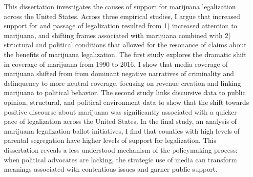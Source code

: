 %

\thesisabstract
{
  This dissertation investigates the causes of support for marijuana legalization across the United States. Across three empirical studies, I argue that increased support for and passage of legalization resulted from 1) increased attention to marijuana, and shifting frames associated with marijuana combined with 2) structural and political conditions that allowed for the resonance of claims about the benefits of marijuana legalization. The first study explores the dramatic shift in coverage of marijuana from 1990 to 2016. I show that media coverage of marijuana shifted from from dominant negative narratives of criminality and delinquency to more neutral coverage, focusing on revenue creation and linking marijuana to political behavior. The second study links discursive data to public opinion, structural, and political environment data to show that the shift towards positive discourse about marijuana was significantly associated with a quicker pace of legalization across the United States. In the final study, an analysis of marijuana legalization ballot initiatives, I find that counties with high levels of parental segregation have higher levels of support for legalization. This dissertation reveals a less understood mechanism of the policymaking process: when political advocates are lacking, the strategic use of media can transform meanings associated with contentious issues and garner public support. 
}


